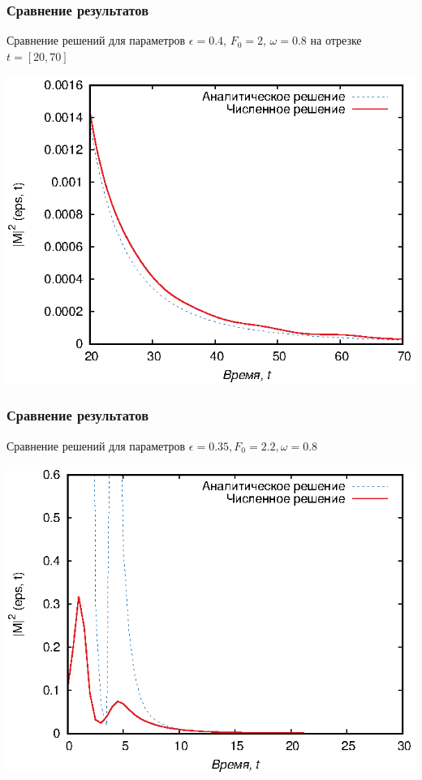 \documentclass{beamer}
\begin{document}
\frame
{
	\frametitle{Сравнение результатов}
	Сравнение решений для параметров $\epsilon = 0.4$, $F_0 = 2$, $\omega = 0.8$ на отрезке $t = [20,70]$
	
	\begin{center}
		\includegraphics{end1}  
	\end{center}	
}

\frame
{
	\frametitle{Сравнение результатов}
	Сравнение решений для параметров $\epsilon = 0.35, F_0 = 2.2, \omega = 0.8$
	
	\begin{center}
		\includegraphics{full2}  
	\end{center}	
}
\end{document}
